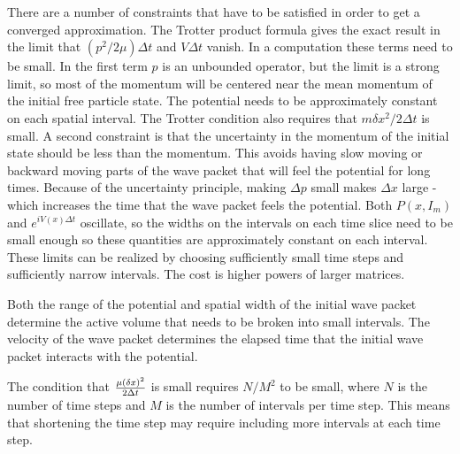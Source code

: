 \documentclass[aps,prc,reprint,noshowpacs,groupedaddress,onecolumn]{revtex4}
\begin{document}
There are a number of constraints that have to be satisfied in order
to get a converged approximation.  The Trotter product formula gives
the exact result in the limit that $(p^2/2\mu)\Delta t$ and
$V\Delta t$ vanish.  In a computation these terms need to be small.
In the first term $p$ is an unbounded operator, but the limit is a
strong limit, so most of the momentum will be centered near the mean
momentum of the initial free particle state.  The potential needs to be
approximately constant on each spatial interval.  The Trotter condition
also requires that  $m \delta x^2 / 2 \Delta t $ is small.
A second constraint is that the uncertainty in
the momentum of the initial state should be less than the momentum.
This avoids having slow moving or backward moving parts of the wave
packet that will feel the potential for long times.  Because of the
uncertainty principle, making $\Delta p$ small makes $\Delta x$ large
- which increases the time that the wave packet feels the potential.
Both $P(x,I_m)$ and $e^{i V(x) \Delta t}$ oscillate, so the widths on
the intervals on each time slice need to be small enough so these
quantities are approximately constant on each interval.  These limits
can be realized by choosing sufficiently small time steps and
sufficiently narrow intervals.  The cost is higher powers of larger
matrices.

Both the range of the potential and spatial width of the initial wave
packet determine the active volume that needs to be broken into 
small intervals.  The velocity of the wave packet determines 
the elapsed time that the initial wave packet interacts with the 
potential.

The condition that ${\mu (\delta x)^2 \over 2 \Delta t}$ is small
requires $N/M^2$ to be small, where $N$ is the number of time steps
and $M$ is the number of intervals per time step.  This means that
shortening the time step may require including more intervals
at each time step.  
\end{document}
